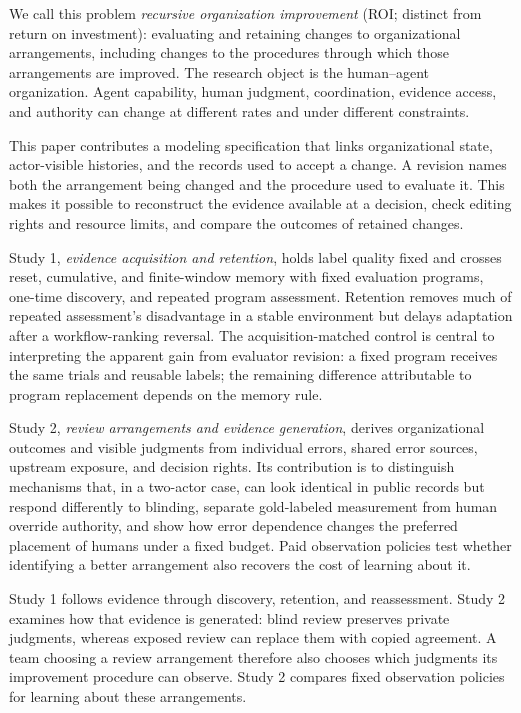 We call this problem \emph{recursive organization improvement} (ROI; distinct from return on investment): evaluating and retaining changes to organizational arrangements, including changes to the procedures through which those arrangements are improved. The research object is the human--agent organization. Agent capability, human judgment, coordination, evidence access, and authority can change at different rates and under different constraints.

This paper contributes a modeling specification that links organizational state, actor-visible histories, and the records used to accept a change. A revision names both the arrangement being changed and the procedure used to evaluate it. This makes it possible to reconstruct the evidence available at a decision, check editing rights and resource limits, and compare the outcomes of retained changes.

Study 1, \emph{evidence acquisition and retention}, holds label quality fixed and crosses reset, cumulative, and finite-window memory with fixed evaluation programs, one-time discovery, and repeated program assessment. Retention removes much of repeated assessment's disadvantage in a stable environment but delays adaptation after a workflow-ranking reversal. The acquisition-matched control is central to interpreting the apparent gain from evaluator revision: a fixed program receives the same trials and reusable labels; the remaining difference attributable to program replacement depends on the memory rule.

Study 2, \emph{review arrangements and evidence generation}, derives organizational outcomes and visible judgments from individual errors, shared error sources, upstream exposure, and decision rights. Its contribution is to distinguish mechanisms that, in a two-actor case, can look identical in public records but respond differently to blinding, separate gold-labeled measurement from human override authority, and show how error dependence changes the preferred placement of humans under a fixed budget. Paid observation policies test whether identifying a better arrangement also recovers the cost of learning about it.

Study 1 follows evidence through discovery, retention, and reassessment. Study 2 examines how that evidence is generated: blind review preserves private judgments, whereas exposed review can replace them with copied agreement. A team choosing a review arrangement therefore also chooses which judgments its improvement procedure can observe. Study 2 compares fixed observation policies for learning about these arrangements.


